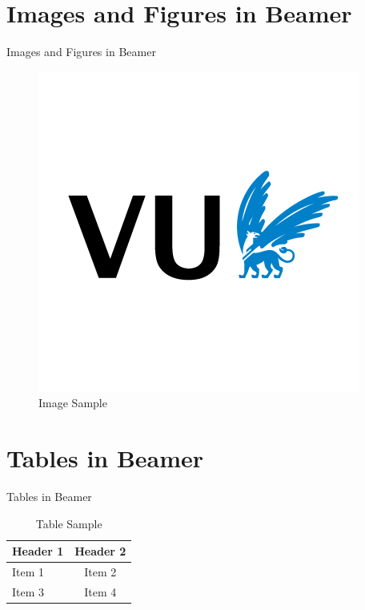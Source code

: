 \documentclass[aspectratio=43]{beamer}
\begin{document}
\section{Images and Figures in Beamer}
\begin{frame}{Images and Figures in Beamer}
  \begin{figure}
    \centering
    \includegraphics[width=.6\textwidth]{assets/VU-avatar-RGB.png}
    \caption{Image Sample}
  \end{figure}
\end{frame}

\section{Tables in Beamer}
\begin{frame}{Tables in Beamer}
  \begin{table}
    \centering
    \begin{tabular}{l|c}
    Header 1 & Header 2 \\
    \hline
    Item 1 & Item 2 \\
    Item 3 & Item 4 \\
    \end{tabular}
    \caption{Table Sample}
  \end{table}
\end{frame}
\end{document}
